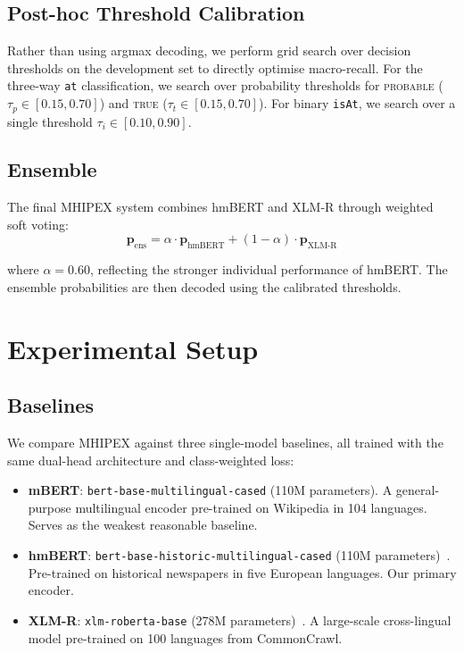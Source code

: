 \documentclass[runningheads]{llncs}
\begin{document}
\subsection{Post-hoc Threshold Calibration}

Rather than using argmax decoding, we perform grid search over decision thresholds on the development set to directly optimise macro-recall. For the three-way \texttt{at} classification, we search over probability thresholds for \textsc{probable} ($\tau_p \in [0.15, 0.70]$) and \textsc{true} ($\tau_t \in [0.15, 0.70]$). For binary \texttt{isAt}, we search over a single threshold $\tau_i \in [0.10, 0.90]$.

\subsection{Ensemble}

The final MHIPEX system combines hmBERT and XLM-R through weighted soft voting:
\begin{equation}
    \mathbf{p}_{\text{ens}} = \alpha \cdot \mathbf{p}_{\text{hmBERT}} + (1-\alpha) \cdot \mathbf{p}_{\text{XLM-R}}
\end{equation}

where $\alpha=0.60$, reflecting the stronger individual performance of hmBERT. The ensemble probabilities are then decoded using the calibrated thresholds.

\section{Experimental Setup}
\label{sec:setup}

\subsection{Baselines}

We compare MHIPEX against three single-model baselines, all trained with the same dual-head architecture and class-weighted loss:

\begin{itemize}
    \item \textbf{mBERT}: \texttt{bert-base-multilingual-cased} (110M parameters). A general-purpose multilingual encoder pre-trained on Wikipedia in 104 languages. Serves as the weakest reasonable baseline.
    \item \textbf{hmBERT}: \texttt{bert-base-historic-multilingual-cased} (110M parameters)~\cite{schweter2022}. Pre-trained on historical newspapers in five European languages. Our primary encoder.
    \item \textbf{XLM-R}: \texttt{xlm-roberta-base} (278M parameters)~\cite{conneau2020}. A large-scale cross-lingual model pre-trained on 100 languages from CommonCrawl.
\end{itemize}
\end{document}
